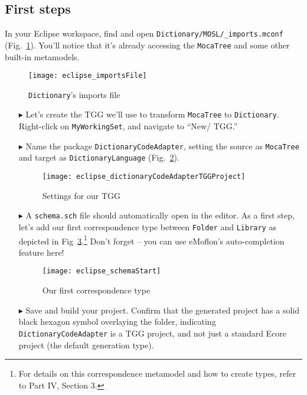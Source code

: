 \newpage
\hypertarget{initialize tex}{}
\subsection{First steps}
\texHeader

In your Eclipse workspace, find and open \texttt{Dictionary/MOSL/\_imports.mconf} (Fig.~\ref{eclipse:standardImports}). You'll notice that it's already
accessing the \texttt{MocaTree} and some other built-in metamodels.

\begin{figure}[htbp]
\begin{center}
  \texttt{[image: eclipse\_importsFile]}
  \caption{\texttt{Dictionary}'s imports file}
  \label{eclipse:standardImports}
\end{center}
\end{figure}

\begin{enumerate}

\item[$\blacktriangleright$] Let's create the TGG we'll use to transform \texttt{MocaTree} to \texttt{Dictionary}. Right-click on \texttt{MyWorkingSet}, and
navigate to ``New/ TGG.''

\item[$\blacktriangleright$] Name the package \texttt{DictionaryCodeAdapter}, setting the source as \texttt{MocaTree} and target as \texttt{DictionaryLanguage}
(Fig.~\ref{eclipse:newTGGProject}).

\begin{figure}[htbp]
\begin{center}
  \texttt{[image: eclipse\_dictionaryCodeAdapterTGGProject]}
  \caption{Settings for our TGG}
  \label{eclipse:newTGGProject}
\end{center}
\end{figure}

\item[$\blacktriangleright$] A \texttt{schema.sch} file should automatically open in the editor. As a first step, let's add our first correspondence type
between \texttt{Folder} and \texttt{Library} as depicted in Fig~\ref{eclipse:firstSchema}.\footnote{For details on this correspondence metamodel and how to
create types, refer to Part IV, Section 3.} Don't forget -- you can use eMoflon's auto-completion feature here!

\begin{figure}[htbp]
\begin{center}
  \texttt{[image: eclipse\_schemaStart]}
  \caption{Our first correspondence type}
  \label{eclipse:firstSchema}
\end{center}
\end{figure}

\item[$\blacktriangleright$] Save and build your project. Confirm that the generated project has a solid black hexagon symbol overlaying the folder, indicating
\texttt{DictionaryCodeAdapter} is a TGG project, and not just a standard Ecore project (the default generation type).

\end{enumerate}
